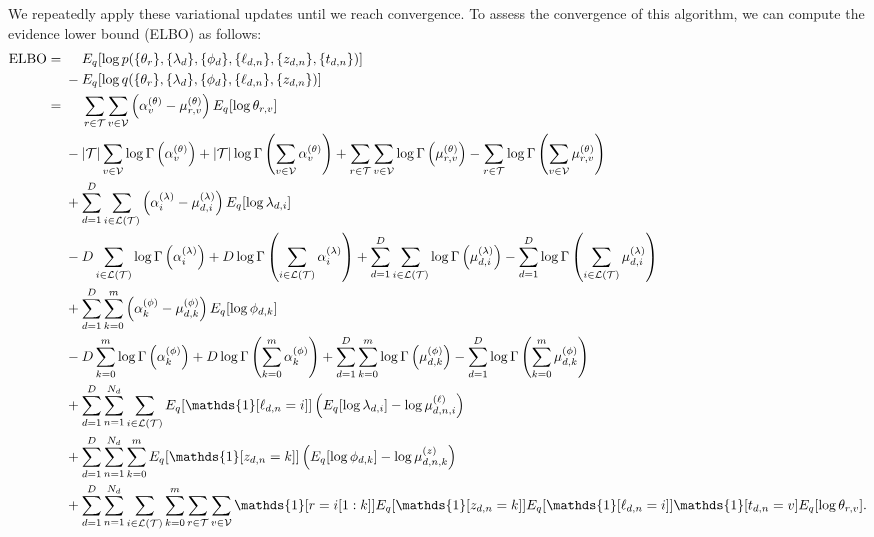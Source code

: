 \documentclass{article}
\newcommand{\indicator}{\mathds{1}}
\begin{document}
We repeatedly apply these variational updates until we reach convergence.
To assess the convergence of this algorithm, we can compute the evidence lower bound (ELBO) as follows:
\begin{align}
\text{ELBO}
={}& \phantom{{}-{}} E_q[\log p(\{\theta_r\}, \{\lambda_d\}, \{\phi_d\}, \{\ell_{d,n}\}, \{z_{d,n}\}, \{t_{d,n}\})] \\
& - E_q[\log q(\{\theta_r\}, \{\lambda_d\}, \{\phi_d\}, \{\ell_{d,n}\}, \{z_{d,n}\})] \nonumber \\
={}& \phantom{{}+{}} \sum_\rPath \sum_\vVocab \left(\alpha^{(\theta)}_v - \mu^{(\theta)}_{r,v}\right) E_q[\log \theta_{r,v}] \\
&- |\mathcal T| \sum_\vVocab \log \Gamma\left( \alpha^{(\theta)}_{v} \right) + |\mathcal T| \log \Gamma\left( \sum_\vVocab \alpha^{(\theta)}_{v} \right)
 + \sum_\rPath \sum_\vVocab \log \Gamma\left( \mu^{(\theta)}_{r,v} \right) - \sum_\rPath \log \Gamma\left( \sum_\vVocab \mu^{(\theta)}_{r,v} \right) \nonumber \\
&+ \sum_\dDoc \sum_\iLeaf \left(\alpha^{(\lambda)}_i - \mu^{(\lambda)}_{d,i}\right) E_q[\log \lambda_{d,i}] \nonumber \\
&- D \sum_\iLeaf \log \Gamma\left( \alpha^{(\lambda)}_{i} \right) + D \log \Gamma\left( \sum_\iLeaf \alpha^{(\lambda)}_{i} \right)
 + \sum_\dDoc \sum_\iLeaf \log \Gamma\left( \mu^{(\lambda)}_{d,i} \right) - \sum_\dDoc \log \Gamma\left( \sum_\iLeaf \mu^{(\lambda)}_{d,i} \right) \nonumber \\
&+ \sum_\dDoc \sum_\kDepth \left(\alpha^{(\phi)}_k - \mu^{(\phi)}_{d,k}\right) E_q[\log \phi_{d,k}] \nonumber \\
&- D \sum_\kDepth \log \Gamma\left( \alpha^{(\phi)}_{k} \right) + D \log \Gamma\left( \sum_\kDepth \alpha^{(\phi)}_{k} \right)
 + \sum_\dDoc \sum_\kDepth \log \Gamma\left( \mu^{(\phi)}_{d,k} \right) - \sum_\dDoc \log \Gamma\left( \sum_\kDepth \mu^{(\phi)}_{d,k} \right) \nonumber \\
&+ \sum_\dDoc \sum_\nWordSlot \sum_\iLeaf E_q[\indicator[\ell_{d,n} = i]] \left(E_q[\log \lambda_{d,i}] - \log \mu^{(\ell)}_{d,n,i}\right) \nonumber \\
&+ \sum_\dDoc \sum_\nWordSlot \sum_\kDepth E_q[\indicator[z_{d,n} = k]] \left(E_q[\log \phi_{d,k}] - \log \mu^{(z)}_{d,n,k}\right) \nonumber \\
&+ \sum_\dDoc \sum_\nWordSlot \sum_\iLeaf \sum_\kDepth \sum_\rPath \sum_\vVocab \indicator[r = i[1:k]] E_q[\indicator[z_{d,n} = k]] E_q[\indicator[\ell_{d,n} = i]] \indicator[t_{d,n} = v] E_q[\log \theta_{r,v}]. \nonumber
\end{align}
\end{document}
